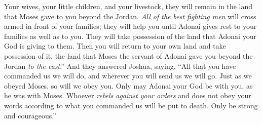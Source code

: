 \begin{biblechapter}
\verse Your wives, your little children, and your livestock, they will remain in the land that Moses gave to you beyond the Jordan. \textit{All of the best fighting men} will cross armed in front of your families; they will help you
\verse until Adonai gives rest to your families as well as to you. They will take possession of the land that Adonai your God is giving to them. Then you will return to your own land and take possession of it, the land that Moses the servant of Adonai gave you beyond the Jordan \textit{to the east}.”
\verse And they answered Joshua, saying, “All that you have commanded us we will do, and wherever you will send us we will go.
\verse Just as we obeyed Moses, so will we obey you. Only may Adonai your God be with you, as he was with Moses.
\verse Whoever \textit{rebels against your orders} and does not obey your words according to what you commanded us will be put to death. Only be strong and courageous.”
\end{biblechapter}

